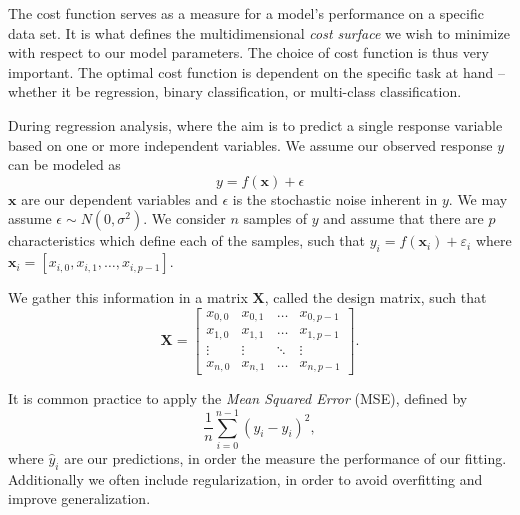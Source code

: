 \documentclass{article}
\theoremstyle{definition}
\begin{document}
The cost function serves as a measure for a model's performance on a specific data set. It is what defines the multidimensional \textit{cost surface} we wish to minimize with respect to our model parameters. The choice of cost function is thus very important. The optimal cost function is dependent on the specific task at hand – whether it be regression, binary classification, or multi-class classification.

During regression analysis, where the aim is to predict a single response variable based on one or more independent variables. We assume our observed response $y$ can be modeled as
\begin{equation*}
    y = f(\boldsymbol{x}) + \epsilon
\end{equation*}
$\mathbf{x}$ are our dependent variables and $\epsilon$ is 
the stochastic noise inherent in $y$. We may assume $\epsilon \sim N(0,\sigma^2)$.
We consider $n$ samples of $y$ and assume that there are $p$ characteristics which define each of the samples, such that $y_i = f(\boldsymbol{x}_i) + \varepsilon_i$ where $\boldsymbol{x}_i = \left[x_{i,0}, x_{i, 1}, \ldots, x_{i, p-1} \right]$.

We gather this information in a matrix $\textbf{X}$, called the design matrix, such that
\begin{equation*}
    \textbf{X} =
    \begin{bmatrix}
        x_{0,0} & x_{0,1} & \ldots & x_{0, p-1} \\
        x_{1,0} & x_{1,1} & \ldots & x_{1, p-1} \\
        \vdots & \vdots & \ddots & \vdots \\
        x_{n,0} & x_{n,1} & \ldots & x_{n, p-1}
    \end{bmatrix}.
\end{equation*}

It is common practice to apply the \textit{Mean Squared Error} (MSE), defined by
\begin{equation*}
    \frac{1}{n} \sum_{i = 0}^{n-1} (y_i - \hat{y}_i)^2,
\end{equation*}
where $\hat{y}_i$ are our predictions, in order the measure the performance of our fitting. Additionally we often include regularization, in order to avoid overfitting and improve generalization. 


\end{document}
